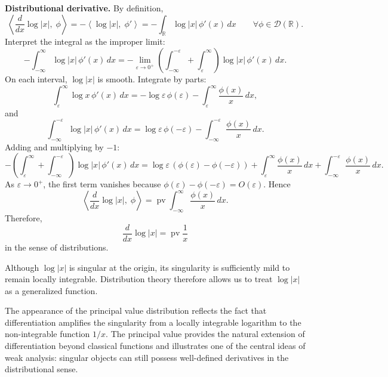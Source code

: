 \begin{solution}
\textbf{Distributional derivative.}
By definition,
\[
\left\langle \frac{d}{dx}\log|x|,\;\phi\right\rangle
=
-\left\langle \log|x|,\;\phi'\right\rangle
=
-\int_{\mathbb{R}} \log|x|\, \phi'(x)\, dx
\qquad \forall\phi\in\mathcal{D}(\mathbb{R}).
\]
Interpret the integral as the improper limit:
\[
-\int_{-\infty}^{\infty} \log|x|\, \phi'(x)\, dx
=
-\lim_{\varepsilon\to0^+}
\left(
\int_{-\infty}^{-\varepsilon} + \int_{\varepsilon}^{\infty}
\right)
\log|x|\, \phi'(x)\, dx.
\]
On each interval, $\log|x|$ is smooth. Integrate by parts:
\[
\int_{\varepsilon}^{\infty} \log x\, \phi'(x)\, dx
=
-\log\varepsilon\, \phi(\varepsilon)
-
\int_{\varepsilon}^{\infty} \frac{\phi(x)}{x}\, dx,
\]
and
\[
\int_{-\infty}^{-\varepsilon} \log|x|\, \phi'(x)\, dx
=
\log\varepsilon\, \phi(-\varepsilon)
-
\int_{-\infty}^{-\varepsilon} \frac{\phi(x)}{x}\, dx.
\]
Adding and multiplying by $-1$:
\[
-\left(
\int_{\varepsilon}^{\infty} + \int_{-\infty}^{-\varepsilon}
\right)
\log|x|\, \phi'(x)\, dx
=
\log\varepsilon\, (\phi(\varepsilon)-\phi(-\varepsilon))
+
\int_{\varepsilon}^{\infty} \frac{\phi(x)}{x}\, dx
+
\int_{-\infty}^{-\varepsilon} \frac{\phi(x)}{x}\, dx.
\]
As $\varepsilon\to0^+$, the first term vanishes because $\phi(\varepsilon)-\phi(-\varepsilon)=O(\varepsilon)$. Hence
\[
\left\langle \frac{d}{dx}\log|x|,\;\phi\right\rangle
=
\operatorname{pv}\int_{-\infty}^{\infty} \frac{\phi(x)}{x}\, dx.
\]
Therefore,
\[
\boxed{\frac{d}{dx}\log|x| = \operatorname{pv}\frac{1}{x}}
\]
in the sense of distributions.

\end{solution}
\begin{interpretation}

Although $\log|x|$ is singular at the origin, its singularity is sufficiently mild to remain locally integrable. Distribution theory therefore allows us to treat $\log|x|$ as a generalized function.

The appearance of the principal value distribution reflects the fact that differentiation amplifies the singularity from a locally integrable logarithm to the non-integrable function \(1/x\). The principal value provides the natural extension of differentiation beyond classical functions and illustrates one of the central ideas of weak analysis: singular objects can still possess well-defined derivatives in the distributional sense.

\end{interpretation}